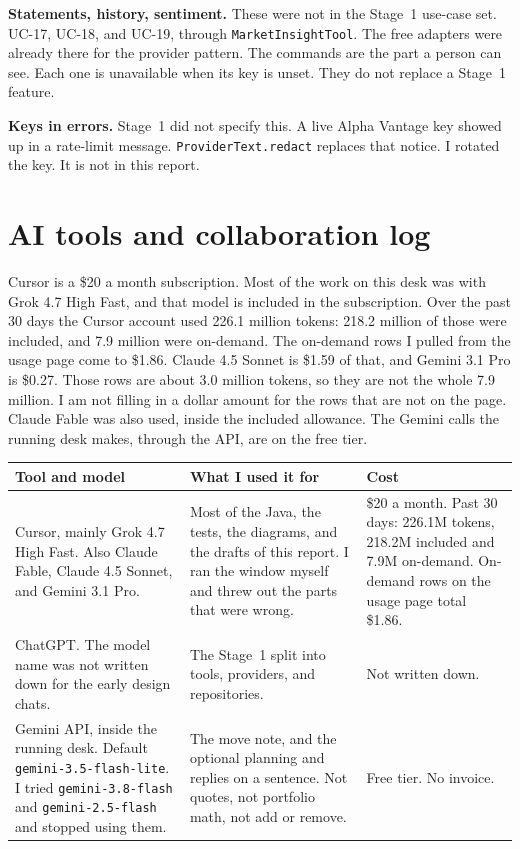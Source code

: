 \documentclass[11pt]{article}
\begin{document}
\textbf{Statements, history, sentiment.}
These were not in the Stage~1 use-case set.
UC-17, UC-18, and UC-19, through \texttt{MarketInsightTool}.
The free adapters were already there for the provider pattern. The commands are the part a person can see.
Each one is unavailable when its key is unset. They do not replace a Stage~1 feature.

\textbf{Keys in errors.}
Stage~1 did not specify this. A live Alpha Vantage key showed up in a rate-limit message.
\texttt{ProviderText.redact} replaces that notice. I rotated the key. It is not in this report.

\section{AI tools and collaboration log}

Cursor is a \$20 a month subscription. Most of the work on this desk was with Grok 4.7 High Fast, and that model is included in the subscription. Over the past 30 days the Cursor account used 226.1 million tokens: 218.2 million of those were included, and 7.9 million were on-demand. The on-demand rows I pulled from the usage page come to \$1.86. Claude 4.5 Sonnet is \$1.59 of that, and Gemini 3.1 Pro is \$0.27. Those rows are about 3.0 million tokens, so they are not the whole 7.9 million. I am not filling in a dollar amount for the rows that are not on the page. Claude Fable was also used, inside the included allowance. The Gemini calls the running desk makes, through the API, are on the free tier.

\begin{center}
\small
\begin{tabularx}{\textwidth}{@{}p{2.7cm}Xp{2.6cm}@{}}
\toprule
Tool and model & What I used it for & Cost \\
\midrule
Cursor, mainly Grok 4.7 High Fast. Also Claude Fable, Claude 4.5 Sonnet, and Gemini 3.1 Pro. &
Most of the Java, the tests, the diagrams, and the drafts of this report. I ran the window myself and threw out the parts that were wrong. &
\$20 a month. Past 30 days: 226.1M tokens, 218.2M included and 7.9M on-demand. On-demand rows on the usage page total \$1.86. \\
\addlinespace
ChatGPT. The model name was not written down for the early design chats. &
The Stage~1 split into tools, providers, and repositories. &
Not written down. \\
\addlinespace
Gemini API, inside the running desk. Default \texttt{gemini-3.5-flash-lite}. I tried \texttt{gemini-3.8-flash} and \texttt{gemini-2.5-flash} and stopped using them. &
The move note, and the optional planning and replies on a sentence. Not quotes, not portfolio math, not add or remove. &
Free tier. No invoice. \\
\bottomrule
\end{tabularx}
\end{center}
\end{document}
